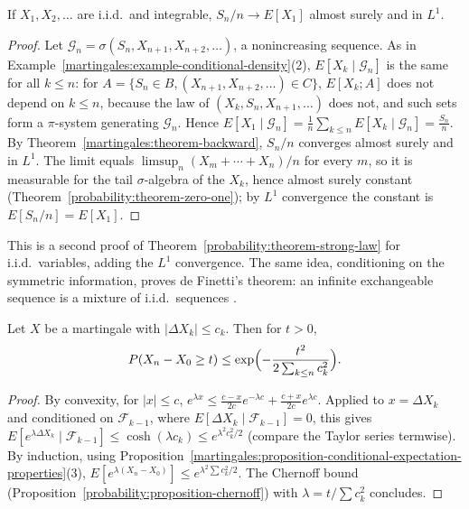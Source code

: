 \begin{corollary}\label{martingales:corollary-strong-law}
If $X_1, X_2, \ldots$ are i.i.d.\ and integrable, $S_n/n \to E[X_1]$ almost surely and in $L^1$.
\end{corollary}

\begin{proof}
Let $\mathcal{G}_n = \sigma(S_n, X_{n+1}, X_{n+2}, \ldots)$, a nonincreasing sequence. As in Example~\ref{martingales:example-conditional-density}(2), $E[X_k \mid \mathcal{G}_n]$ is the same for all $k \leq n$: for
$A = \{S_n \in B, (X_{n+1}, X_{n+2}, \ldots) \in C\}$, $E[X_k; A]$ does not depend on $k \leq n$, because the law of $(X_k, S_n, X_{n+1}, \ldots)$ does not, and such sets form a $\pi$-system generating $\mathcal{G}_n$. Hence
$E[X_1 \mid \mathcal{G}_n] = \frac1n\sum_{k \leq n}E[X_k \mid \mathcal{G}_n] = \frac{S_n}{n}$. By Theorem~\ref{martingales:theorem-backward}, $S_n/n$ converges almost surely and in $L^1$. The limit equals $\limsup_n(X_m + \cdots + X_n)/n$ for every $m$,
so it is measurable for the tail $\sigma$-algebra of the $X_k$, hence almost surely constant (Theorem~\ref{probability:theorem-zero-one}); by $L^1$ convergence the constant is $E[S_n/n] = E[X_1]$.
\end{proof}

This is a second proof of Theorem~\ref{probability:theorem-strong-law} for i.i.d.\ variables, adding the $L^1$ convergence. The same idea, conditioning on the symmetric information, proves de Finetti's theorem: an
infinite exchangeable sequence is a mixture of i.i.d.\ sequences \cite{kallenberg}.

\begin{theorem}\label{martingales:theorem-azuma}
Let $X$ be a martingale with $|\Delta X_k| \leq c_k$. Then for $t > 0$,
\[
P(X_n - X_0 \geq t) \leq \exp\Bigl(-\frac{t^2}{2\sum_{k \leq n}c_k^2}\Bigr).
\]
\end{theorem}

\begin{proof}
By convexity, for $|x| \leq c$, $e^{\lambda x} \leq \frac{c - x}{2c}e^{-\lambda c} + \frac{c + x}{2c}e^{\lambda c}$. Applied to $x = \Delta X_k$ and conditioned on $\mathcal{F}_{k-1}$, where $E[\Delta X_k \mid \mathcal{F}_{k-1}] = 0$, this gives
$E[e^{\lambda\Delta X_k} \mid \mathcal{F}_{k-1}] \leq \cosh(\lambda c_k) \leq e^{\lambda^2c_k^2/2}$ (compare the Taylor series termwise). By induction, using Proposition~\ref{martingales:proposition-conditional-expectation-properties}(3),
$E[e^{\lambda(X_n - X_0)}] \leq e^{\lambda^2\sum c_k^2/2}$. The Chernoff bound (Proposition~\ref{probability:proposition-chernoff}) with $\lambda = t/\sum c_k^2$ concludes.
\end{proof}

